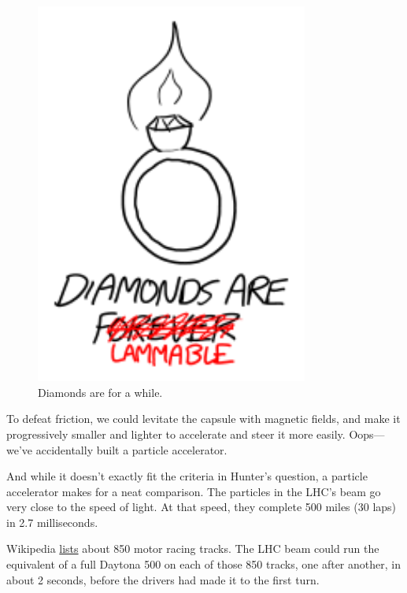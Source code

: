 {\begin{figure}[!htbp]
\centering
\includegraphics[scale=0.5, max width=0.8\textwidth]{imgs/a/116/fire.png}
\caption{Diamonds are for a while.}
\end{figure}

{To defeat friction, we could levitate the capsule with magnetic fields, and make it progressively smaller and lighter to accelerate and steer it more easily. Oops—we've accidentally built a particle accelerator.}

{And while it doesn't exactly fit the criteria in Hunter's question, a particle accelerator makes for a neat comparison. The particles in the LHC's beam go very close to the speed of light. At that speed, they complete 500 miles (30 laps) in 2.7 milliseconds.}

{Wikipedia \href{http://en.wikipedia.org/wiki/List\_of\_motor\_racing\_tracks}{lists} about 850 motor racing tracks. The LHC beam could run the equivalent of a full Daytona 500 on each of those 850 tracks, one after another, in about 2 seconds, before the drivers had made it to the first turn.}

}
